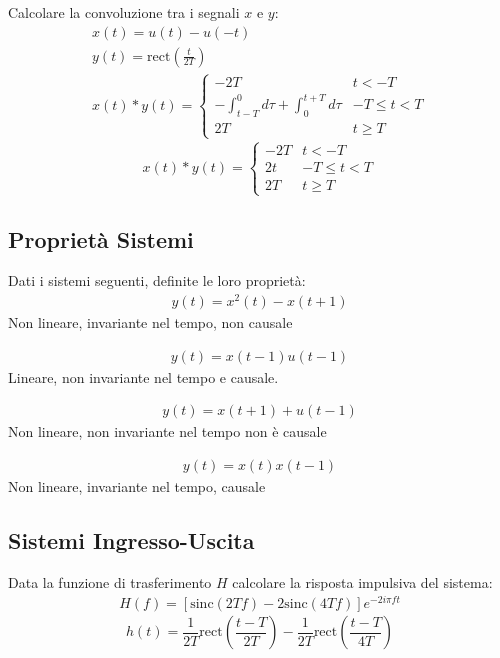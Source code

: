 \documentclass{article}
\begin{document}
Calcolare la convoluzione tra i segnali $x$ e $y$:
\begin{gather*}
    x(t)=u(t)-u(-t)\\
    y(t)=\mbox{rect}\displaystyle\left(\frac{t}{2T}\right)\\
    x(t)*y(t)=\begin{cases}
        -2T&t<-T\\
        \displaystyle-\int_{t-T}^{0}d\tau+\int_{0}^{t+T}d\tau &-T\leq t<T\\
        2T &t\geq T
    \end{cases}
\end{gather*}
\begin{equation}
    x(t)*y(t)=\begin{cases}
        -2T&t<-T\\
        2t&-T\leq t<T\\
        2T &t\geq T
    \end{cases}
\end{equation}

\subsection{Proprietà Sistemi}

Dati i sistemi seguenti, definite le loro proprietà: 
\begin{gather*}
    y(t)=x^2(t)-x(t+1)
\end{gather*}
Non lineare, invariante nel tempo, non causale

\begin{gather*}
    y(t)=x(t-1)u(t-1)
\end{gather*}
Lineare, non invariante nel tempo e causale. 

\begin{gather*}
    y(t)=x(t+1)+u(t-1)
\end{gather*}
Non lineare, non invariante nel tempo non è causale

\begin{gather*}
    y(t)=x(t)x(t-1)
\end{gather*}
Non lineare, invariante nel tempo, causale

\subsection{Sistemi Ingresso-Uscita}

Data la funzione di trasferimento $H$ calcolare la risposta impulsiva del sistema:
\begin{gather*}
    H(f)=\left[\mbox{sinc}\displaystyle(2Tf)-2\mbox{sinc}(4Tf)\right]e^{-2i\pi ft}
\end{gather*}
\begin{equation}
    h(t)=\displaystyle\frac{1}{2T}\mbox{rect}\left(\frac{t-T}{2T}\right)-\frac{1}{2T}\mbox{rect}\left(\frac{t-T}{4T}\right)
\end{equation}
\end{document}
